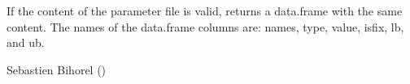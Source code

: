 \begin{Arguments}
\begin{ldescription}
\begin{description}
\end{description}


\end{ldescription}
\end{Arguments}
%
\begin{Value}
If the content of the parameter file is valid, 
returns a data.frame with the same content. The names of the data.frame 
columns are: names, type, value, isfix, lb, and ub.
\end{Value}
%
\begin{Author}\relax
Sebastien Bihorel ()
\end{Author}
%
\begin{SeeAlso}\relax
{}
\end{SeeAlso}
